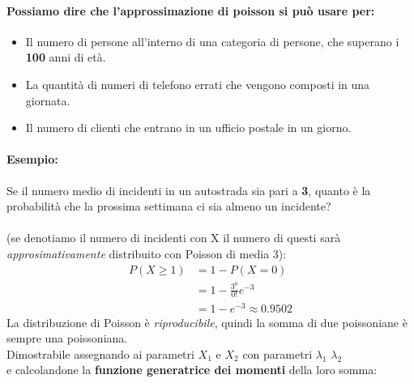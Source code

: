 \documentclass[]{article}
\begin{document}
    \paragraph{Possiamo dire che l'approssimazione di poisson si può usare per:}
    \begin{itemize}
        \item Il numero di persone all'interno di una categoria di persone, che superano i \textbf{100} anni di età.
        \item La quantità di numeri di telefono errati che vengono composti in una giornata.
        \item Il numero di clienti che entrano in un ufficio postale in un giorno.
    \end{itemize}

    \paragraph{Esempio:} Se il numero medio di incidenti in un autostrada sia pari a \textbf{3}, quanto è la probabilità
    che la prossima settimana ci sia almeno un incidente? \\ \\
    (se denotiamo il numero di incidenti con X il numero di questi sarà \textit{approsimativamente} distribuito con Poisson di media 3):
    \begin{equation*}
        \begin{split}
            P(X \geq 1) &= 1 - P(X = 0)\\
            & = 1 - \frac{3^0}{0!} e^{-3} \\
            & = 1 - e^{-3} \approx 0.9502
        \end{split}
    \end{equation*}
    La distribuzione di Poisson è \textit{riproducibile}, quindi la somma di due poissoniane è sempre una poissoniana. \\
    Dimostrabile assegnando ai parametri $X_1$ e $X_2$ con parametri $\lambda_1$ $\lambda_2$ \\
    e calcolandone la \textbf{funzione generatrice dei momenti} della loro somma:
\end{document}
